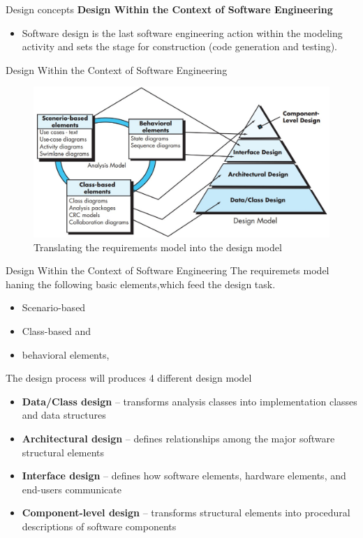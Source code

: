 \documentclass{beamer}
\begin{document}
\begin{frame}{Design concepts}
	\textbf{Design Within the Context of Software Engineering}
	\begin{itemize}
		\item Software design is the last software engineering action within the modeling activity       and sets the stage for construction (code generation and testing).
	\end{itemize}
\end{frame}
\begin{frame}{Design Within the Context of Software Engineering}
	\begin{figure}
	\includegraphics[scale=.45]{img/m2_33.jpg}
	\caption{Translating the requirements model into the design model }
\end{figure}
\end{frame}
\begin{frame}{Design Within the Context of Software Engineering}
	The requiremets model haning the following basic elements,which feed the design task.
	\begin{itemize}
		\item Scenario-based
		\item Class-based and
		\item behavioral elements,
	\end{itemize}
The design process will produces 4 different design model
\begin{itemize}
	\item \textbf{Data/Class design} – transforms analysis classes into implementation classes and data structures
	\item \textbf{Architectural design} – defines relationships among the major software structural elements
	\item \textbf{Interface design} – defines how software elements, hardware elements, and end-users communicate
	\item  \textbf{Component-level design} – transforms structural elements into procedural descriptions of software components
\end{itemize}
\end{frame}
\end{document}
